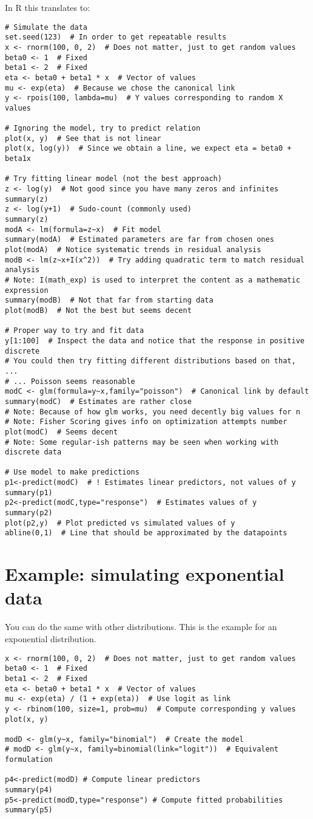 In R this translates to:
\begin{verbatim}
# Simulate the data
set.seed(123)  # In order to get repeatable results
x <- rnorm(100, 0, 2)  # Does not matter, just to get random values 
beta0 <- 1  # Fixed
beta1 <- 2  # Fixed
eta <- beta0 + beta1 * x  # Vector of values
mu <- exp(eta)  # Because we chose the canonical link
y <- rpois(100, lambda=mu)  # Y values corresponding to random X values

# Ignoring the model, try to predict relation
plot(x, y)  # See that is not linear
plot(x, log(y))  # Since we obtain a line, we expect eta = beta0 + beta1x

# Try fitting linear model (not the best approach)
z <- log(y)  # Not good since you have many zeros and infinites
summary(z)  
z <- log(y+1)  # Sudo-count (commonly used)
summary(z)
modA <- lm(formula=z~x)  # Fit model
summary(modA)  # Estimated parameters are far from chosen ones
plot(modA)  # Notice systematic trends in residual analysis 
modB <- lm(z~x+I(x^2))  # Try adding quadratic term to match residual analysis
# Note: I(math_exp) is used to interpret the content as a mathematic expression
summary(modB)  # Not that far from starting data
plot(modB)  # Not the best but seems decent

# Proper way to try and fit data
y[1:100]  # Inspect the data and notice that the response in positive discrete
# You could then try fitting different distributions based on that, ...
# ... Poisson seems reasonable
modC <- glm(formula=y~x,family="poisson")  # Canonical link by default
summary(modC)  # Estimates are rather close
# Note: Because of how glm works, you need decently big values for n
# Note: Fisher Scoring gives info on optimization attempts number
plot(modC)  # Seems decent
# Note: Some regular-ish patterns may be seen when working with discrete data

# Use model to make predictions
p1<-predict(modC)  # ! Estimates linear predictors, not values of y
summary(p1)  
p2<-predict(modC,type="response")  # Estimates values of y
summary(p2)
plot(p2,y)  # Plot predicted vs simulated values of y
abline(0,1)  # Line that should be approximated by the datapoints 
\end{verbatim}

\section{Example: simulating exponential data}
You can do the same with other distributions. This is the example for an exponential distribution.
\begin{verbatim}
x <- rnorm(100, 0, 2)  # Does not matter, just to get random values 
beta0 <- 1  # Fixed
beta1 <- 2  # Fixed
eta <- beta0 + beta1 * x  # Vector of values
mu <- exp(eta) / (1 + exp(eta))  # Use logit as link
y <- rbinom(100, size=1, prob=mu)  # Compute corresponding y values
plot(x, y)

modD <- glm(y~x, family="binomial")  # Create the model
# modD <- glm(y~x, family=binomial(link="logit"))  # Equivalent formulation

p4<-predict(modD) # Compute linear predictors
summary(p4)
p5<-predict(modD,type="response") # Compute fitted probabilities
summary(p5)
\end{verbatim}
